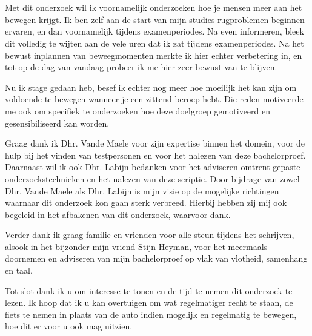 
\chapter*{}%
\label{ch:voorwoord}


Met dit onderzoek wil ik voornamelijk onderzoeken hoe je mensen meer aan het bewegen krijgt. Ik ben zelf aan de start van mijn studies rugproblemen beginnen ervaren, en dan voornamelijk tijdens examenperiodes. Na even informeren, bleek dit volledig te wijten aan de vele uren dat ik zat tijdens examenperiodes. Na het bewust inplannen van beweegmomenten merkte ik hier echter verbetering in, en tot op de dag van vandaag probeer ik me hier zeer bewust van te blijven.

Nu ik stage gedaan heb, besef ik echter nog meer hoe moeilijk het kan zijn om voldoende te bewegen wanneer je een zittend beroep hebt. Die reden motiveerde me ook om specifiek te onderzoeken hoe deze doelgroep gemotiveerd en gesensibiliseerd kan worden.

Graag dank ik Dhr. Vande Maele voor zijn expertise binnen het domein, voor de hulp bij het vinden van testpersonen en voor het nalezen van deze bachelorproef. Daarnaast wil ik ook Dhr. Labijn bedanken voor het adviseren omtrent gepaste onderzoekstechnieken en het nalezen van deze scriptie. Door bijdrage van zowel Dhr. Vande Maele als Dhr. Labijn is mijn visie op de mogelijke richtingen waarnaar dit onderzoek kon gaan sterk verbreed. Hierbij hebben zij mij ook begeleid in het afbakenen van dit onderzoek, waarvoor dank.

Verder dank ik graag familie en vrienden voor alle steun tijdens het schrijven, alsook in het bijzonder mijn vriend Stijn Heyman, voor het meermaals doornemen en adviseren van mijn bachelorproef op vlak van vlotheid, samenhang en taal.

Tot slot dank ik u om interesse te tonen en de tijd te nemen dit onderzoek te lezen. Ik hoop dat ik u kan overtuigen om wat regelmatiger recht te staan, de fiets te nemen in plaats van de auto indien mogelijk en regelmatig te bewegen, hoe dit er voor u ook mag uitzien.